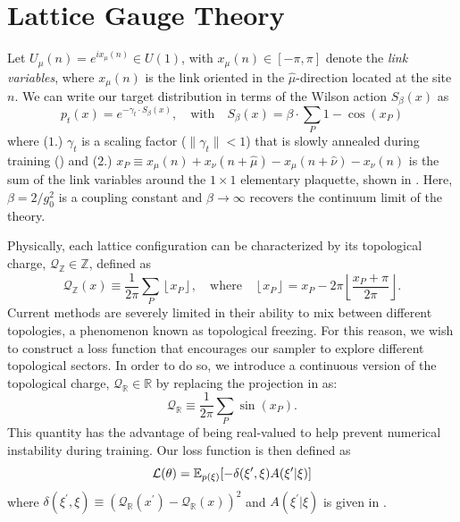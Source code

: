 \documentclass{article} %
\begin{document}
\section{\label{sec:lattice_gauge_theory}Lattice Gauge Theory}
%
Let \(U_{\mu}(n) = e^{i x_{\mu}(n)} \in U(1)\), with \(x_{\mu}(n) \in [-\pi,\pi]\) denote the \emph{link
variables}, where \(x_{\mu}(n)\) is the link oriented in the \(\hat{\mu}\)-direction located at the site
\(n\).
%
We can write our target distribution in terms of the Wilson action \(S_{\beta}(x)\) as
%
\begin{equation}
   p_{t}(x) = e^{-\gamma_{t}\cdot S_{\beta}(x)},\quad\text{with}\quad S_{\beta}(x) = \beta\cdot \sum_{P}1 - \cos(x_{P})
   \label{eq:wilsonaction}
\end{equation}
%
where (\(1\).) \(\gamma_{t}\) is a scaling factor (\(\|\gamma_{t}\|<1\)) that is slowly annealed during training () and (\(2\).) \(x_{P} \equiv x_{\mu}(n) + x_{\nu}(n+\hat{\mu}) - x_{\mu}(n+\hat{\nu}) -x_{\nu}(n)\) is the sum of the link
variables around the \(1\times1\) elementary plaquette, shown in .
%
Here, \(\beta = 2 / g_{0}^{2}\) is a coupling constant and \(\beta\rightarrow\infty\) recovers the continuum limit of the theory. 
%

Physically, each lattice configuration can be characterized by its topological charge, \(\mathcal{Q}_{\mathbb{Z}}\in\mathbb{Z}\), defined as
%
\begin{equation}
      \mathcal{Q}_{\mathbb{Z}}(x) \equiv \frac{1}{2\pi}\sum_{P}\left\lfloor x_{P}\right\rfloor,
   \quad\text{where}\quad \left\lfloor x_{P}\right\rfloor = x_{P} -
   2\pi\left\lfloor\frac{x_{P}+\pi}{2\pi}\right\rfloor.
   \label{eq:intcharge}
\end{equation}
%
Current methods are severely limited in their ability to mix between different topologies, a phenomenon known as topological freezing.
%
For this reason, we wish to construct a loss function that encourages our sampler to explore different topological sectors.
%
In order to do so, we introduce a continuous version of the topological charge, \(\mathcal{Q}_{\mathbb{R}}\in\mathbb{R}\) by replacing the projection in  as:
%
\begin{equation}
    \mathcal{Q}_{\mathbb{R}} \equiv \frac{1}{2\pi}\sum_{P}\sin(x_{P}).
    \label{eq:sincharge}
\end{equation}
%
This quantity has the advantage of being real-valued to help prevent numerical instability during training.
%
Our loss function is then defined as
%
\begin{equation}
   \mathcal{L}(\theta) = \mathbb{E}_{p(\xi)}{%
      \left[-\delta(\xi^{\prime}, \xi) A(\xi^{\prime}|\xi)\right]
   }
\end{equation}
%
where \(\delta(\xi^{\prime}, \xi) \equiv {\left(\mathcal{Q}_{\mathbb{R}}(x^{\prime}) - \mathcal{Q}_{\mathbb{R}}(x)\right)}^{2}\) and \(A(\xi^{\prime}|\xi)\) is given in .
%
%
\end{document}
